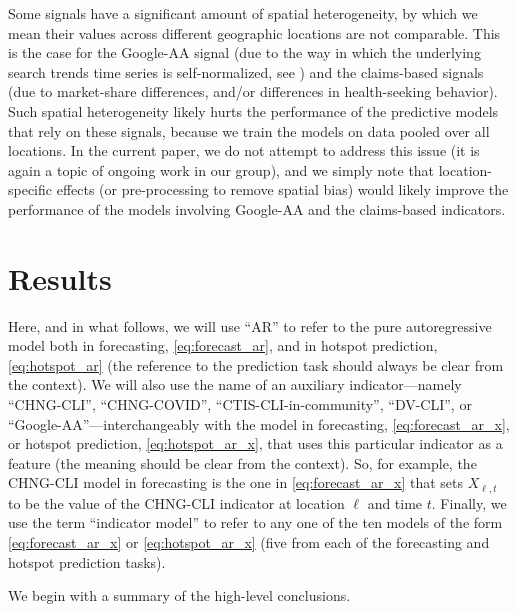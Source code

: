 \documentclass[9pt,twocolumn,twoside,lineno]{pnas-new}
\begin{document}
Some signals have a significant amount of spatial heterogeneity, by which we
mean their values across different geographic locations are not comparable.
This is the case for the Google-AA signal (due to the way in which the
underlying search trends time series is self-normalized, see
\cite{GoogleSymptoms}) and the claims-based signals (due to market-share 
differences, and/or differences in health-seeking behavior).  Such spatial
heterogeneity likely hurts the performance of the predictive models that rely on
these signals, because we train the models on data pooled over all locations.
In the current paper, we do not attempt to address this issue (it is again a
topic of ongoing work in our group), and we simply note that location-specific
effects (or pre-processing to remove spatial bias) would likely improve the
performance of the models involving Google-AA and the claims-based indicators.

\section{Results}

Here, and in what follows, we will use ``AR'' to refer to the pure 
autoregressive model both in forecasting, \eqref{eq:forecast_ar}, and in hotspot
prediction, \eqref{eq:hotspot_ar} (the reference to the prediction task should
always be clear from the context). We will also use the name of an auxiliary 
indicator---namely ``CHNG-CLI'',  ``CHNG-COVID'', ``CTIS-CLI-in-community'',
``DV-CLI'', or ``Google-AA''---interchangeably with the model in forecasting, 
\eqref{eq:forecast_ar_x}, or hotspot prediction, \eqref{eq:hotspot_ar_x}, that
uses this particular indicator as a feature (the meaning should be clear from
the context).  So, for example, the CHNG-CLI model in forecasting is the one in  
\eqref{eq:forecast_ar_x} that sets $X_{\ell,t}$ to be the value of the CHNG-CLI 
indicator at location $\ell$ and time $t$.
Finally, we use the term ``indicator model'' to refer to any one of the ten
models of the form \eqref{eq:forecast_ar_x} or \eqref{eq:hotspot_ar_x} (five
from each of the forecasting and hotspot prediction tasks).

We begin with a summary of the high-level conclusions.  
\end{document}
